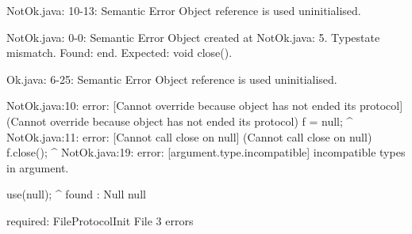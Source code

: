 \lstset{language=,caption=Original Mungo output}
\begin{code}

NotOk.java: 10-13: Semantic Error
		Object reference is used uninitialised.

NotOk.java: 0-0: Semantic Error
		Object created at NotOk.java: 5. Typestate mismatch. Found: end. Expected: void close().

Ok.java: 6-25: Semantic Error
		Object reference is used uninitialised.
\end{code}

\lstset{language=,caption=New Mungo output}
\begin{code}
NotOk.java:10: error: [Cannot override because object has not ended its protocol] (Cannot override because object has not ended its protocol)
        f = null;
        ^
NotOk.java:11: error: [Cannot call close on null] (Cannot call close on null)
        f.close();
               ^
NotOk.java:19: error: [argument.type.incompatible] incompatible types in argument.

    use(null);
        ^
  found   : Null null

  required: FileProtocol{Init} File
3 errors
\end{code}

